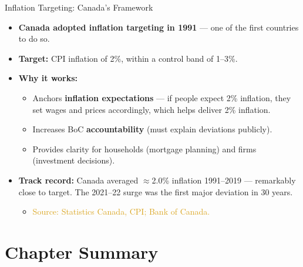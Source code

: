 \documentclass[aspectratio=169]{beamer}
\begin{document}
\begin{frame}{Inflation Targeting: Canada's Framework}
\transfade
\begin{itemize}[<+->]
  \item \textbf{Canada adopted inflation targeting in 1991} --- one of the first countries to do so.
  \item \textbf{Target:} CPI inflation of \alert{2\%}, within a control band of 1--3\%.
  \item \textbf{Why it works:}
  \begin{itemize}[<+->]
    \item Anchors \textbf{inflation expectations} --- if people expect 2\% inflation, they set wages and prices accordingly, which helps deliver 2\% inflation.
    \item Increases BoC \textbf{accountability} (must explain deviations publicly).
    \item Provides clarity for households (mortgage planning) and firms (investment decisions).
  \end{itemize}
  \item \textbf{Track record:} Canada averaged $\approx$\alert{2.0\%} inflation 1991--2019 --- remarkably close to target. The 2021--22 surge was the first major deviation in 30 years.
  \begin{itemize}[<+->]
    \item \textcolor{goldenrod}{Source: Statistics Canada, CPI; Bank of Canada.}
  \end{itemize}
\end{itemize}
\end{frame}

\section*{Chapter Summary}
\end{document}
